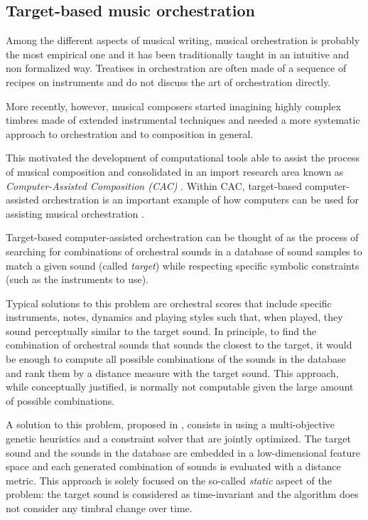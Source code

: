 \documentclass[a4paper]{book}
\begin{document}
\subsection{Target-based music orchestration}\label{sec:tbmo}

Among the different aspects of musical writing, musical orchestration is probably the most empirical one and it has been traditionally taught in an intuitive and non formalized way. Treatises in orchestration are often made of a sequence of recipes on instruments and do not discuss the art of orchestration directly.

More recently, however, musical composers started imagining highly complex timbres made of extended instrumental techniques and needed a more systematic approach to orchestration and to composition in general. 

This motivated the development of computational tools able to assist the process of musical composition and consolidated in an import research area known as \emph{Computer-Assisted Composition (CAC)} \cite{Fernandez2013, Ariza2005}. Within CAC, target-based computer-assisted orchestration is an important example of how computers can be used for {assisting} musical orchestration \cite{Maresz2013}. 

Target-based computer-assisted orchestration can be thought of as the process of searching for combinations of orchestral sounds in a database of sound samples to match a given sound (called \emph{target}) while respecting specific symbolic constraints (such as the instruments to use).

Typical solutions to this problem are orchestral scores that include specific instruments, notes, dynamics and playing styles such that, when played, they sound perceptually similar to the target sound. In principle, to find the combination of orchestral sounds that sounds the closest to the target, it would be enough to compute all possible combinations of the sounds in the database and rank them by a distance measure with the target sound. This approach, while conceptually justified, is normally not computable given the large amount of possible combinations.

A solution to this problem, proposed in \cite{Carpentier2007}, consists in using a multi-objective genetic heuristics and a constraint solver that are jointly optimized. The target sound and the sounds in the database are embedded in a low-dimensional feature space and each generated combination of sounds is evaluated with a distance metric. 
This approach is solely focused on the so-called \emph{static} aspect of the problem: the target sound is considered as time-invariant and the algorithm does not consider any timbral change over time.
\end{document}

